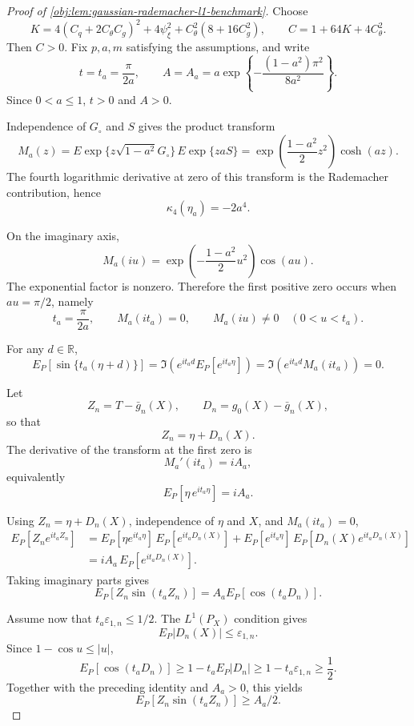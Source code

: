 \documentclass[11pt]{article}
\begin{document}
\begin{proof}[Proof of \cref{obj:lem:gaussian-rademacher-l1-benchmark}]
Choose
\[
K=
4(C_q+2C_{\theta}C_g)^2+4\psi_\xi^2
+
C_{\theta}^2(8+16C_g^2),
\qquad
C=1+64K+4C_{\theta}^2 .
\]
Then \(C>0\).  Fix \(p,a,m\) satisfying the assumptions, and write
\[
t=t_a=\frac{\pi}{2a},
\qquad
A=A_a=a\exp\!\left\{-\frac{(1-a^2)\pi^2}{8a^2}\right\}.
\]
Since \(0<a\le1\), \(t>0\) and \(A>0\). %

Independence of \(G_\circ\) and \(S\) gives the product transform
\[
M_a(z)
=
E\exp\{z\sqrt{1-a^2}G_\circ\}\,
E\exp\{zaS\}
=
\exp\!\left(\frac{1-a^2}{2}z^2\right)\cosh(az).
\]
The fourth logarithmic derivative at zero of this transform is the Rademacher contribution, hence
\[
\kappa_4(\eta_a)=-2a^4 .
\]

On the imaginary axis,
\[
M_a(iu)=
\exp\!\left(-\frac{1-a^2}{2}u^2\right)\cos(au).
\]
The exponential factor is nonzero.  Therefore the first positive zero occurs when \(au=\pi/2\), namely
\[
t_a=\frac{\pi}{2a},
\qquad
M_a(it_a)=0,
\qquad
M_a(iu)\ne0\quad(0<u<t_a).
\]

For any \(d\in\mathbb R\),
\[
E_P[\sin\{t_a(\eta+d)\}]
=
\Im\left(e^{it_ad}E_P[e^{it_a\eta}]\right)
=
\Im\left(e^{it_ad}M_a(it_a)\right)
=
0 .
\]

Let
\[
Z_n=T-\bar g_n(X),
\qquad
D_n=g_0(X)-\bar g_n(X),
\]
so that
\[
Z_n=\eta+D_n(X).
\]
The derivative of the transform at the first zero is
\[
M_a'(it_a)
=
iA_a,
\]
equivalently
\[
E_P\!\left[\eta\,e^{it_a\eta}\right]=iA_a .
\]

Using \(Z_n=\eta+D_n(X)\), independence of \(\eta\) and \(X\), and \(M_a(it_a)=0\),
\[
\begin{aligned}
E_P[Z_ne^{it_aZ_n}]
&=
E_P[\eta e^{it_a\eta}]\,E_P[e^{it_aD_n(X)}]
+
E_P[e^{it_a\eta}]\,E_P[D_n(X)e^{it_aD_n(X)}]  \\
&=
iA_a\,E_P[e^{it_aD_n(X)}].
\end{aligned}
\]
Taking imaginary parts gives
\[
E_P[Z_n\sin(t_aZ_n)]
=
A_aE_P[\cos(t_aD_n)] .
\]

Assume now that \(t_a\varepsilon_{1,n}\le1/2\).  The \(L^1(P_X)\) condition gives
\[
E_P|D_n(X)|\le\varepsilon_{1,n}.
\]
Since \(1-\cos u\le |u|\),
\[
E_P[\cos(t_aD_n)]
\ge
1-t_aE_P|D_n|
\ge
1-t_a\varepsilon_{1,n}
\ge
\frac12 .
\]
Together with the preceding identity and \(A_a>0\), this yields
\[
E_P[Z_n\sin(t_aZ_n)]\ge A_a/2 .
\]


\end{proof}
\end{document}
